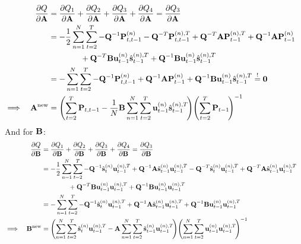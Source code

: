 		\begin{align*}
			&& \pdv{Q}{\mat{A}}
				&= \pdv{Q_1}{\mat{A}} + \pdv{Q_2}{\mat{A}} + \pdv{Q_3}{\mat{A}} + \pdv{Q_4}{\mat{A}} = \pdv{Q_3}{\mat{A}} & \\
			&&	&= -\frac{1}{2} \sum_{n = 1}^{N} \sum_{t = 2}^{T} - \mat{Q}^{-1} \mat{P}_{t, t - 1}^{(n)} - \mat{Q}^{-T} \mat{P}_{t, t - 1}^{(n), T} + \mat{Q}^{-T} \mat{A} \mat{P}_{t - 1}^{(n), T} + \mat{Q}^{-1} \mat{A} \mat{P}_{t - 1}^{(n)} & \\
				&&&\qquad\qquad + \mat{Q}^{-T} \mat{B} \vec{u}_{t - 1}^{(n)} \hat{\vec{s}}_{t - 1}^{(n), T} + \mat{Q}^{-1} \mat{B} \vec{u}_{t - 1}^{(n)} \hat{\vec{s}}_{t - 1}^{(n), T} & \\
			&&	&= -\sum_{n = 1}^{N} \sum_{t = 2}^{T} - \mat{Q}^{-1} \mat{P}_{t, t - 1}^{(n)} + \mat{Q}^{-1} \mat{A} \mat{P}_{t - 1}^{(n)} + \mat{Q}^{-1} \mat{B} \vec{u}_{t - 1}^{(n)} \hat{\vec{s}}_{t - 1}^{(n), T} \overset{!}{=} \mat{0} & \\
			\implies && \mat{A}^\new &= \Bigg(\! \sum_{t = 2}^{T} \mat{P}_{t, t - 1} - \frac{1}{N} \mat{B} \sum_{n = 1}^{N} \sum_{t = 2}^{T} \vec{u}_{t - 1}^{(n)} \hat{\vec{s}}_{t - 1}^{(n), T} \!\Bigg) \Bigg(\! \sum_{t = 2}^{T} \mat{P}_{t - 1} \!\Bigg)^{-1} &
		\end{align*}
		And for \(\mat{B}\):
		\begin{align*}
			&& \pdv{Q}{\mat{B}}
				&= \pdv{Q_1}{\mat{B}} + \pdv{Q_2}{\mat{B}} + \pdv{Q_3}{\mat{B}} + \pdv{Q_4}{\mat{B}} = \pdv{Q_3}{\mat{B}} & \\
			&&	&= -\frac{1}{2} \sum_{n = 1}^{N} \sum_{t = 2}^{T} - \mat{Q}^{-1} \hat{\vec{s}}_t^{(n)} \vec{u}_{t - 1}^{(n), T} + \mat{Q}^{-1} \mat{A} \hat{\vec{s}}_{t - 1}^{(n)} \vec{u}_{t - 1}^{(n), T} - \mat{Q}^{-T} \hat{\vec{s}}_t^{(n)} \vec{u}_{t - 1}^{(n), T} + \mat{Q}^{-T} \mat{A} \hat{\vec{s}}_{t - 1}^{(n)} \vec{u}_{t - 1}^{(n), T} & \\
				&&&\qquad\qquad + \mat{Q}^{-T} \mat{B} \vec{u}_{t - 1}^{(n)} \vec{u}_{t - 1}^{(n), T} + \mat{Q}^{-1} \mat{B} \vec{u}_{t - 1}^{(n)} \vec{u}_{t - 1}^{(n), T} & \\
			&&	&= -\sum_{n = 1}^{N} \sum_{t = 2}^{T} -\mat{Q}^{-1} \hat{\vec{s}}_t^{(n)} \vec{u}_{t - 1}^{(n), T} + \mat{Q}^{-1} \mat{A} \hat{\vec{s}}_{t - 1}^{(n)} \vec{u}_{t - 1}^{(n), T} + \mat{Q}^{-1} \mat{B} \vec{u}_{t - 1}^{(n)} \vec{u}_{t - 1}^{(n), T} & \\
			\implies && \mat{B}^\new &= \Bigg(\! \sum_{n = 1}^{N} \sum_{t = 2}^{T} \hat{\vec{s}}_t^{(n)} \vec{u}_{t - 1}^{(n), T} - \mat{A} \sum_{n = 1}^{N} \sum_{t = 2}^{T} \hat{\vec{s}}_{t - 1}^{(n)} \vec{u}_{t - 1}^{(n), T} \!\Bigg) \Bigg(\! \sum_{n = 1}^{N} \sum_{t = 2}^{T} \vec{u}_{t - 1}^{(n)} \vec{u}_{t - 1}^{(n), T} \!\Bigg)^{-1} &
		\end{align*}
